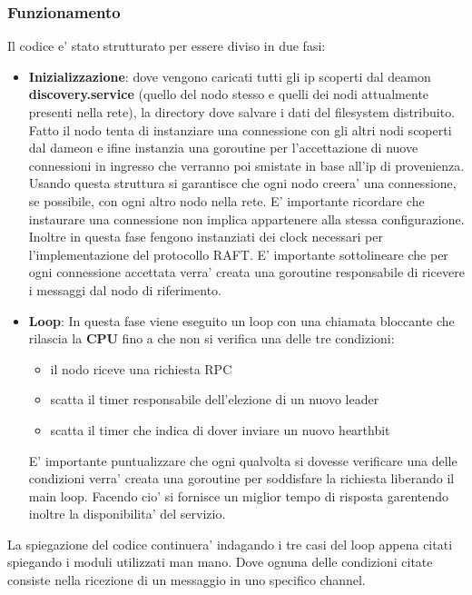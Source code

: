 \subsubsection{Funzionamento}
Il codice e' stato strutturato per essere diviso in due fasi: 
\begin{itemize}
    \item \textbf{Inizializzazione}: dove vengono caricati tutti gli ip scoperti dal deamon
        \textbf{discovery.service} (quello del nodo stesso e quelli dei nodi attualmente presenti 
        nella rete), la directory dove salvare i dati del filesystem distribuito. Fatto 
        il nodo tenta di instanziare una connessione con gli altri nodi scoperti dal dameon e 
        ifine instanzia una goroutine per l'accettazione di nuove connessioni in ingresso che 
        verranno poi smistate in base all'ip di provenienza. Usando questa struttura si garantisce
        che ogni nodo creera' una connessione, se possibile, con ogni altro nodo nella rete. 
        E' importante ricordare che instaurare una connessione non implica appartenere 
        alla stessa configurazione. Inoltre in questa fase fengono instanziati
        dei clock necessari per l'implementazione del protocollo RAFT.
        E' importante sottolineare che per ogni connessione accettata verra' creata una 
        goroutine responsabile di ricevere i messaggi dal nodo di riferimento.
    \item \textbf{Loop}: In questa fase viene eseguito un loop con una chiamata bloccante che 
        rilascia la \textbf{CPU} fino a che non si verifica una delle tre condizioni:
        \begin{itemize}
            \item il nodo riceve una richiesta RPC
            \item scatta il timer responsabile dell'elezione di un nuovo leader
            \item scatta il timer che indica di dover inviare un nuovo hearthbit
        \end{itemize}
        E' importante puntualizzare che ogni qualvolta si dovesse verificare una delle condizioni
        verra' creata una goroutine per soddisfare la richiesta liberando il main loop.
        Facendo cio' si fornisce un miglior tempo di risposta garentendo inoltre la disponibilita' 
        del servizio.
\end{itemize}
La spiegazione del codice continuera' indagando i tre casi del loop appena citati spiegando i moduli 
utilizzati man mano. Dove ognuna delle condizioni citate consiste nella ricezione di un messaggio
in uno specifico channel.

